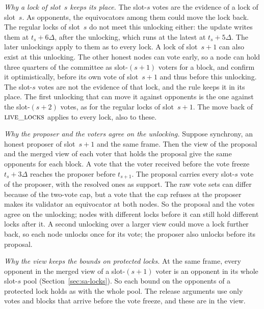 \documentclass{article}
\begin{document}
\emph{Why a lock of slot~$s$ keeps its place.}  The slot-$s$ votes are the
evidence of a lock of slot~$s$.  As opponents, the equivocators among them
could move the lock back.  The regular locks of slot~$s$ do not meet this
unlocking either: the update writes them at $t_s+6\Delta$, after the
unlocking, which runs at the latest at $t_s+5\Delta$.  The later
unlockings apply to them as to every lock.  A lock of slot~$s+1$ can also
exist at this unlocking.  The other honest nodes can vote early, so a
node can hold three quarters of the committee as slot-$(s+1)$ voters for
a block, and confirm it optimistically, before its own vote of
slot~$s+1$ and thus before this unlocking.  The slot-$s$ votes are not the
evidence of that lock, and the rule keeps it in its place.  The first
unlocking that can move it against opponents is the one against the
slot-$(s+2)$ votes, as for the regular locks of slot~$s+1$.  The move back
of $\Call{live\_locks}{}$ applies to every lock, also to these.

\emph{Why the proposer and the voters agree on the unlocking.}  Suppose
synchrony, an honest proposer of slot~$s+1$ and the same frame.  Then the
view of the proposal and the merged view of each voter that holds the
proposal give the same opponents for each block.  A vote that the voter
received before the vote freeze $t_s+3\Delta$ reaches the proposer
before $t_{s+1}$.  The proposal carries every slot-$s$ vote of the
proposer, with the resolved ones as support.  The raw vote sets can
differ because of the two-vote cap, but a vote that the cap refuses at
the proposer makes its validator an equivocator at both nodes.  So the
proposal and the votes agree on the unlocking; nodes with different
locks before it can still hold different locks after it.  A second
unlocking over a larger view could move a lock further back, so each node
unlocks once for its vote; the proposer also unlocks before its proposal.

\emph{Why the view keeps the bounds on protected locks.}  At the same
frame, every opponent in the merged view of a slot-$(s+1)$ voter is an
opponent in its whole slot-$s$ pool (Section~\ref{sec:sa-locks}).  So each bound on the opponents of a
protected lock holds as with the whole pool.  The release arguments use
only votes and blocks that arrive before the vote freeze, and these are in
the view.
\end{document}

